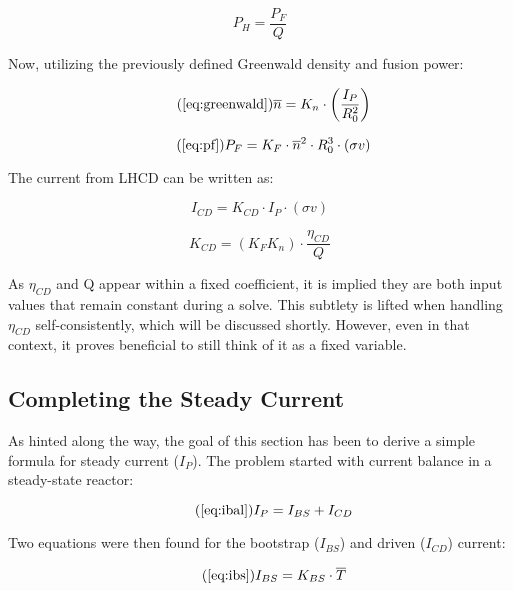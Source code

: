\begin{equation}
	P_H = \frac{P_F}{Q}
\end{equation}

Now, utilizing the previously defined Greenwald density and fusion power:

 \begin{equation}
 	\tag{\ref{eq:greenwald}}
 	\overline n = K_n \cdot \left( \frac{I_P}{R_0^2} \right)
 \end{equation}
 
 \begin{equation}
	\tag{\ref{eq:pf}}
	P_F = K_F \cdot \overline{n}^2 \cdot R_0^3  \cdot (\sigma v)
\end{equation}

The current from LHCD can be written as:

\begin{equation}
	\label{eq:icd}
	I_{CD} = K_{CD} \cdot I_P \cdot ( \sigma v )
\end{equation}

\begin{equation}
	K_{CD} = \left( K_F K_n \right) \cdot \frac{\eta_{CD}}{Q}
\end{equation}

As $\eta_{CD}$ and Q appear within a fixed coefficient, it is implied they are both input values that remain constant during a solve. This subtlety is lifted when handling $\eta_{CD}$ self-consistently, which will be discussed shortly. However, even in that context, it proves beneficial to still think of it as a fixed variable.

\subsection{Completing the Steady Current}

As hinted along the way, the goal of this section has been to derive a simple formula for steady current ($I_P$). The problem started with current balance in a steady-state reactor:

\begin{equation}
	\tag{\ref{eq:ibal}}
	I_P = I_{BS} + I_{CD}
\end{equation}

Two equations were then found for the bootstrap ($I_{BS}$) and driven ($I_{CD}$) current:

\begin{equation}
	\tag{\ref{eq:ibs}}
	I_{BS} = K_{BS} \cdot \overline T
\end{equation}

